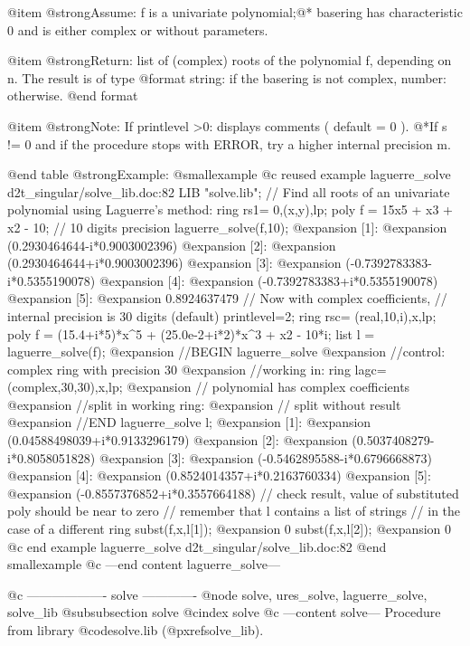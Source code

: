 @item @strong{Assume:}
f is a univariate polynomial;@*
basering has characteristic 0 and is either complex or without
parameters.

@item @strong{Return:}
list of (complex) roots of the polynomial f, depending on n. The
result is of type
@format
 string: if the basering is not complex,
 number: otherwise.
@end format

@item @strong{Note:}
If printlevel >0: displays comments ( default = 0 ).
@*If s != 0 and if the procedure stops with ERROR, try a higher
internal precision m.

@end table
@strong{Example:}
@smallexample
@c reused example laguerre_solve d2t_singular/solve_lib.doc:82 
LIB "solve.lib";
// Find all roots of an univariate polynomial using Laguerre's method:
ring rs1= 0,(x,y),lp;
poly f = 15x5 + x3 + x2 - 10;
// 10 digits precision
laguerre_solve(f,10);
@expansion{} [1]:
@expansion{}    (0.2930464644-i*0.9003002396)
@expansion{} [2]:
@expansion{}    (0.2930464644+i*0.9003002396)
@expansion{} [3]:
@expansion{}    (-0.7392783383-i*0.5355190078)
@expansion{} [4]:
@expansion{}    (-0.7392783383+i*0.5355190078)
@expansion{} [5]:
@expansion{}    0.8924637479
// Now with complex coefficients,
// internal precision is 30 digits (default)
printlevel=2;
ring rsc= (real,10,i),x,lp;
poly f = (15.4+i*5)*x^5 + (25.0e-2+i*2)*x^3 + x2 - 10*i;
list l = laguerre_solve(f);
@expansion{} //BEGIN laguerre_solve
@expansion{} //control: complex ring with precision 30
@expansion{} //working in:  ring lagc=(complex,30,30),x,lp;
@expansion{} //         polynomial has complex coefficients
@expansion{} //split in working ring:
@expansion{} // split without result
@expansion{} //END laguerre_solve
l;
@expansion{} [1]:
@expansion{}    (0.04588498039+i*0.9133296179)
@expansion{} [2]:
@expansion{}    (0.5037408279-i*0.8058051828)
@expansion{} [3]:
@expansion{}    (-0.5462895588-i*0.6796668873)
@expansion{} [4]:
@expansion{}    (0.8524014357+i*0.2163760334)
@expansion{} [5]:
@expansion{}    (-0.8557376852+i*0.3557664188)
// check result, value of substituted poly should be near to zero
// remember that l contains a list of strings
// in the case of a different ring
subst(f,x,l[1]);
@expansion{} 0
subst(f,x,l[2]);
@expansion{} 0
@c end example laguerre_solve d2t_singular/solve_lib.doc:82
@end smallexample
@c ---end content laguerre_solve---

@c ------------------- solve -------------
@node solve, ures_solve, laguerre_solve, solve_lib
@subsubsection solve
@cindex solve
@c ---content solve---
Procedure from library @code{solve.lib} (@pxref{solve_lib}).

